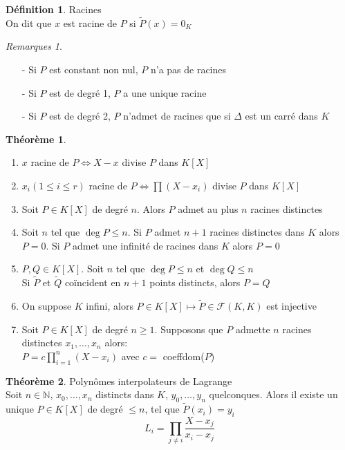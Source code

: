 \documentclass[fleqn]{article}
\theoremstyle{definition} \newtheorem*{defi}{D\'efinition}
\theoremstyle{definition} \newtheorem*{theo}{Th\'eor\`eme}
\theoremstyle{definition} \newtheorem*{coro}{Corollaire}
\theoremstyle{definition} \newtheorem*{nota}{Notation}
\theoremstyle{remark} \newtheorem*{rqs}{Remarques}
\theoremstyle{definition} \newtheorem*{prop}{Propri\'et\'e}
\begin{document}
\begin{defi} Racines \\
	On dit que $x$ est racine de $P$ si $\tilde{P}(x) = 0_K$
	\begin{rqs} $ $
		\begin{itemize}
			\item [-] Si $P$ est constant non nul, $P$ n'a pas de racines
			\item [-] Si $P$ est de degr\'e 1, $P$ a une unique racine
			\item [-] Si $P$ est de degr\'e 2, $P$ n'admet de racines que si $\Delta$ est un carr\'e dans $K$
		\end{itemize}
	\end{rqs}
\end{defi}

\begin{theo} $ $
	\begin{enumerate}
		\item $x$ racine de $P \Leftrightarrow X - x$ divise $P$ dans $K[X]$
		\item $x_i (1 \leq i \leq r)$ racine de $P \Leftrightarrow \prod (X - x_i)$ divise $P$ dans $K[X]$
		\item Soit $P \in K[X]$ de degr\'e $n$. Alors $P$ admet au plus $n$ racines distinctes
		\item Soit $n$ tel que $\deg P \leq n$. Si $P$ admet $n+1$ racines distinctes dans $K$ alors $P = 0$.
			Si $P$ admet une infinit\'e de racines dans $K$ alors $P = 0$
		\item $P,Q \in K[X]$. Soit $n$ tel que $\deg P \leq n$ et $\deg Q \leq n$ \\
			Si $\tilde{P}$ et $\tilde{Q}$ co\"incident en $n+1$ points distincts, alors $P=Q$
		\item On suppose $K$ infini, alors $P \in K[X] \mapsto \tilde{P} \in \mathcal{F}(K,K)$ est injective
		\item Soit $P \in K[X]$ de degr\'e $n \geq 1$. Supposons que $P$ admette $n$ racines distinctes $x_1, \hdots, x_n$ alors: \\
			$P = c\prod_{i=1}^n(X-x_i)$ avec $c = $ coeffdom($P$)
	\end{enumerate}
\end{theo}

\begin{theo} Polyn\^omes interpolateurs de Lagrange \\
	Soit $n\in \mathbb{N}$, $x_0, \hdots, x_n$ distincts dans $K$, $y_0, \hdots, y_n$ quelconques. Alors il existe un unique $P \in K[X]$
	de degr\'e $\leq n$, tel que $\tilde{P}(x_i) = y_i$
	\[L_i =\prod_{j\neq i} \frac{X-x_j}{x_i - x_j}\]
\end{theo}
\end{document}
